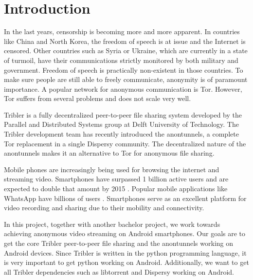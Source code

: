 \chapter{Introduction}

In the last years, censorship is becoming more and more apparent. In countries like China and North Korea, the freedom of speech is at issue and the Internet is censored. Other countries such as Syria or Ukraine, which are currently in a state of turmoil, have their communications strictly monitored by both military and government. Freedom of speech is practically non-existent in those countries. To make sure people are still able to freely communicate, anonymity is of paramount importance. A popular network for anonymous communication is Tor. However, Tor suffers from several problems and does not scale very well.

Tribler is a fully decentralized peer-to-peer file sharing system developed by the Parallel and Distributed Systems group at Delft University of Technology. The Tribler development team has recently introduced the anontunnels, a complete Tor replacement in a single Dispersy community. The decentralized nature of the anontunnels makes it an alternative to Tor for anonymous file sharing.

Mobile phones are increasingly being used for browsing the internet and streaming video. Smartphones have surpassed 1 billion active users and are expected to double that amount by 2015 \cite{yang2015smartphones}. Popular mobile applications like WhatsApp have billions of users \cite{googleplayinstagram, googleplaywhatsapp}. Smartphones serve as an excellent platform for video recording and sharing due to their mobility and connectivity.

In this project, together with another bachelor project, we work towards achieving anonymous video streaming on Android smartphones. Our goals are to get the core Tribler peer-to-peer file sharing and the anontunnels working on Android devices. Since Tribler is written in the python programming language, it is very important to get python working on Android. Additionally, we want to get all Tribler dependencies such as libtorrent and Dispersy working on Android.